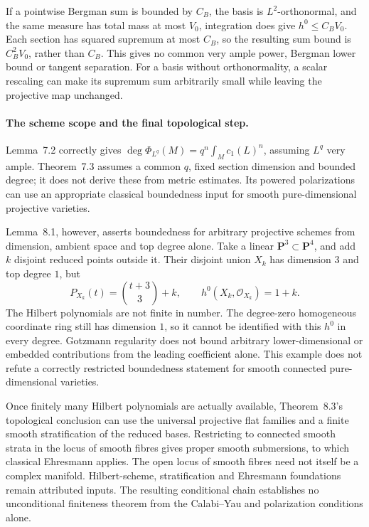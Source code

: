 If a pointwise Bergman sum is bounded by \(C_B\), the basis is
\(L^2\)-orthonormal, and the same measure has total mass at most \(V_0\),
integration does give \(h^0\leq C_BV_0\). Each section has squared
supremum at most \(C_B\), so the resulting sum bound is
\(C_B^2V_0\), rather than \(C_B\). This gives no common very ample
power, Bergman lower bound or tangent separation.
For a basis without orthonormality, a scalar rescaling can make
its supremum sum arbitrarily small while leaving the projective
map unchanged.

\paragraph{The scheme scope and the final topological step.}
Lemma~7.2 correctly gives
\(\deg\Phi_{L^q}(M)=q^n\int_Mc_1(L)^n\), assuming \(L^q\) very ample.
Theorem~7.3 assumes a common \(q\), fixed section dimension and bounded
degree; it does not derive these from metric estimates.
Its powered polarizations can use an appropriate classical boundedness
input for smooth pure-dimensional projective varieties.

Lemma~8.1, however, asserts boundedness for arbitrary projective schemes
from dimension, ambient space and top degree alone.
Take a linear \(\mathbf P^3\subset\mathbf P^4\), and add \(k\) disjoint
reduced points outside it. Their disjoint union \(X_k\) has dimension
\(3\) and top degree \(1\), but
\[
 P_{X_k}(t)=\binom{t+3}{3}+k,\qquad
 h^0(X_k,\mathcal O_{X_k})=1+k.
\]
The Hilbert polynomials are not finite in number.
The degree-zero homogeneous coordinate ring still has dimension \(1\),
so it cannot be identified with this \(h^0\) in every degree.
Gotzmann regularity does not bound arbitrary lower-dimensional or
embedded contributions from the leading coefficient alone.
This example does not refute a correctly restricted boundedness
statement for smooth connected pure-dimensional varieties.

Once finitely many Hilbert polynomials are actually available,
Theorem~8.3's topological conclusion can use the universal projective
flat families and a finite smooth stratification of the reduced bases.
Restricting to connected smooth strata in the locus of smooth fibres
gives proper smooth submersions, to which classical Ehresmann applies.
The open locus of smooth fibres need not itself be a complex manifold.
Hilbert-scheme, stratification and Ehresmann foundations remain
attributed inputs. The resulting conditional chain establishes no
unconditional finiteness theorem from the Calabi--Yau and polarization
conditions alone.

